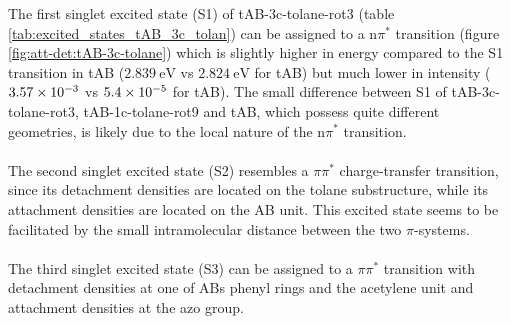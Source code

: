 %
%
The first singlet excited state (S1) of tAB-3c-tolane-rot3 (table \ref{tab:excited_states_tAB_3c_tolan}) can be assigned to  a n$\pi^*$ transition (figure \ref{fig:att-det:tAB-3c-tolane}) which is slightly higher in energy compared to the S1 transition in tAB ($\SI{2.839}{\eV}$ vs $\SI{2.824}{\eV}$ for tAB) but much lower in intensity ($\SI{3.57E-3}{}$ vs $\SI{5.4E-5}{}$ for tAB).
The small difference between S1 of tAB-3c-tolane-rot3, tAB-1c-tolane-rot9 and tAB, which possess quite different geometries, is likely due to the local nature of the n$\pi^*$ transition.\\
\\
The second singlet excited state (S2) resembles a $\pi\pi^*$ charge-transfer transition, since its detachment densities are located on the tolane substructure,
while its attachment densities are located on the AB unit. 
This excited state seems to be facilitated by the small intramolecular distance between the two $\pi$-systems.\\ 
\\
The third singlet excited state (S3) can be assigned to a $\pi\pi^*$ transition with detachment densities at one of ABs phenyl rings and the acetylene unit and attachment densities at the azo group.

